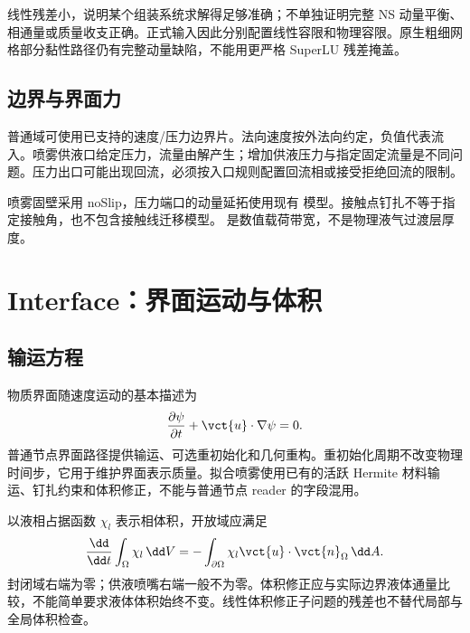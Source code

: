 \documentclass[a4paper,11pt]{article}
\begin{document}
线性残差小，说明某个组装系统求解得足够准确；不单独证明完整 NS 动量平衡、相通量或质量收支正确。正式输入因此分别配置线性容限和物理容限。原生粗细网格部分黏性路径仍有完整动量缺陷，不能用更严格 SuperLU 残差掩盖。

\subsection{边界与界面力}
普通域可使用已支持的速度/压力边界片。法向速度按外法向约定，负值代表流入。喷雾供液口给定压力，流量由解产生；增加供液压力与指定固定流量是不同问题。压力出口可能出现回流，必须按入口规则配置回流相或接受拒绝回流的限制。

喷雾固壁采用 noSlip，压力端口的动量延拓使用现有  模型。接触点钉扎不等于指定接触角，也不包含接触线迁移模型。 是数值载荷带宽，不是物理液气过渡层厚度。

\section{Interface：界面运动与体积}
\subsection{输运方程}
物质界面随速度运动的基本描述为
\begin{equation}
\frac{\partial\psi}{\partial t}+\vct{u}\cdot\nabla\psi=0.
\end{equation}
普通节点界面路径提供输运、可选重初始化和几何重构。重初始化周期不改变物理时间步，它用于维护界面表示质量。拟合喷雾使用已有的活跃 Hermite 材料输运、钉扎约束和体积修正，不能与普通节点 reader 的字段混用。

以液相占据函数 $\chi_l$ 表示相体积，开放域应满足
\begin{equation}
\frac{\dd}{\dd t}\int_{\Omega}\chi_l\,\dd V
=-\int_{\partial\Omega}\chi_l\vct{u}\cdot\vct{n}_\Omega\,\dd A.
\end{equation}
封闭域右端为零；供液喷嘴右端一般不为零。体积修正应与实际边界液体通量比较，不能简单要求液体体积始终不变。线性体积修正子问题的残差也不替代局部与全局体积检查。
\end{document}
